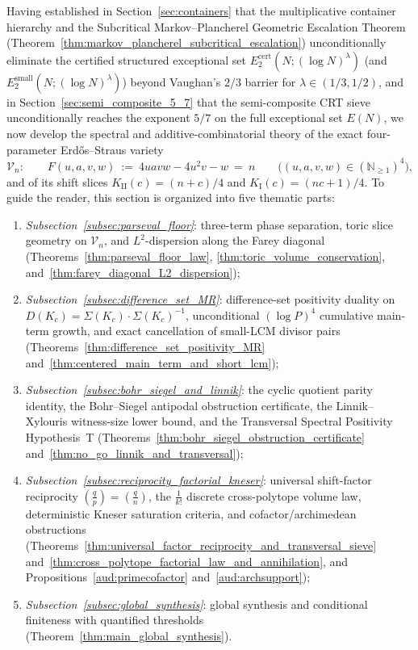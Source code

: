 \documentclass[11pt, a4paper]{article}
\theoremstyle{plain}
\theoremstyle{definition}
\newcommand{\N}{\mathbb{N}}
\newcommand{\leg}[2]{\left(\frac{#1}{#2}\right)}
\newcommand{\I}{\mathrm{I}}
\newcommand{\II}{\mathrm{II}}
\begin{document}
Having established in Section~\ref{sec:containers} that the multiplicative container hierarchy and the Subcritical Markov--Plancherel Geometric Escalation Theorem (Theorem~\ref{thm:markov_plancherel_subcritical_escalation}) unconditionally eliminate the certified structured exceptional set $E_2^{\mathrm{cert}}(N;(\log N)^{\lambda})$ (and\linebreak $E_2^{\mathrm{small}}(N;(\log N)^{\lambda})$) beyond Vaughan's $2/3$ barrier for $\lambda\in(1/3,1/2)$, and in Section~\ref{sec:semi_composite_5_7} that the semi-composite CRT sieve unconditionally reaches the exponent $5/7$ on the full exceptional set $E(N)$, we now develop the spectral and additive-combinatorial theory of the exact four-parameter Erd\H{o}s--Straus variety
\begin{equation}\label{eq:toric_threefold_Vn}
\mathcal{V}_n:\qquad F(u,a,v,w)\ :=\ 4uavw-4u^{2}v-w\ =\ n\qquad\big((u,a,v,w)\in(\N_{\ge1})^{4}\big),
\end{equation}
and of its shift slices $K_{\II}(c)=(n+c)/4$ and $K_{\I}(c)=(nc+1)/4$. To guide the reader, this section is organized into five thematic parts:
\begin{enumerate}[(1)]
    \item \emph{Subsection~\ref{subsec:parseval_floor}}: three-term phase separation, toric slice geometry on $\mathcal{V}_n$, and $L^{2}$-dispersion along the Farey diagonal (Theorems~\ref{thm:parseval_floor_law}, \ref{thm:toric_volume_conservation}, and~\ref{thm:farey_diagonal_L2_dispersion});
    \item \emph{Subsection~\ref{subsec:difference_set_MR}}: difference-set positivity duality on $D(K_c)=\Sigma(K_c)\cdot\Sigma(K_c)^{-1}$, unconditional $(\log P)^{4}$ cumulative main-term growth, and exact cancellation of small-LCM divisor pairs (Theorems~\ref{thm:difference_set_positivity_MR} and~\ref{thm:centered_main_term_and_short_lcm});
    \item \emph{Subsection~\ref{subsec:bohr_siegel_and_linnik}}: the cyclic quotient parity identity, the Bohr--Siegel antipodal obstruction certificate, the Linnik--Xylouris witness-size lower bound, and the Transversal Spectral Positivity Hypothesis~T (Theorems~\ref{thm:bohr_siegel_obstruction_certificate} and~\ref{thm:no_go_linnik_and_transversal});
    \item \emph{Subsection~\ref{subsec:reciprocity_factorial_kneser}}: universal shift-factor reciprocity $\leg{q}{p}=\leg{q}{n}$, the $\frac{1}{k!}$ discrete cross-polytope volume law, deterministic Kneser saturation criteria, and cofactor/archimedean obstructions (Theorems~\ref{thm:universal_factor_reciprocity_and_transversal_sieve} and~\ref{thm:cross_polytope_factorial_law_and_annihilation}, and Propositions~\ref{aud:primecofactor} and~\ref{aud:archsupport});
    \item \emph{Subsection~\ref{subsec:global_synthesis}}: global synthesis and conditional finiteness with quantified thresholds (Theorem~\ref{thm:main_global_synthesis}).
\end{enumerate}
\end{document}
